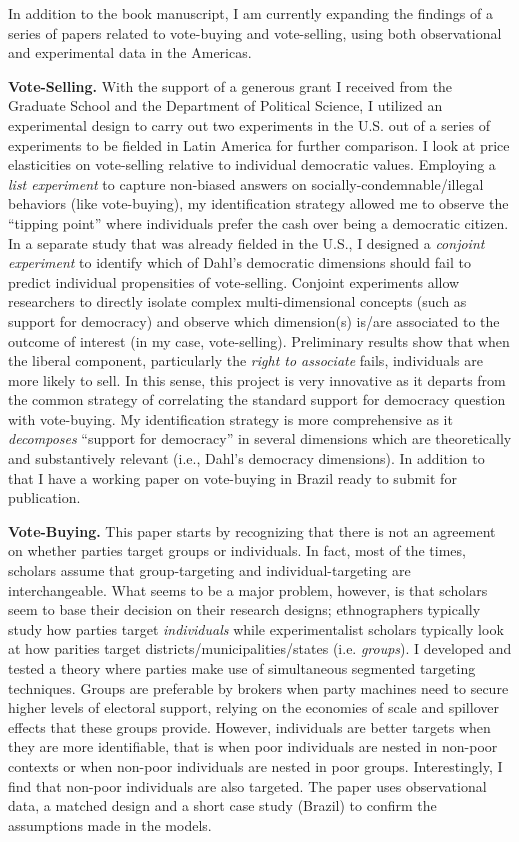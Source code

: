 \documentclass[10pt,stdletter,dateno,sigleft]{newlfm} %
\begin{document}
\begin{newlfm}
In addition to the book manuscript, I am currently expanding the findings of a series of papers related to vote-buying and vote-selling, using both observational and experimental data in the Americas. 

{\bf Vote-Selling.} With the support of a generous grant I received from the Graduate School and the Department of Political Science, I utilized an experimental design to carry out two experiments in the U.S. out of a series of experiments to be fielded in Latin America for further comparison. I look at price elasticities on vote-selling relative to individual democratic values. Employing a \emph{list experiment} to capture non-biased answers on socially-condemnable/illegal behaviors (like vote-buying), my identification strategy allowed me to observe the ``tipping point'' where individuals prefer the cash over being a democratic citizen. In a separate study that was already fielded in the U.S., I designed a \emph{conjoint experiment} to identify which of Dahl's democratic dimensions should fail to predict individual propensities of vote-selling. Conjoint experiments allow researchers to directly isolate complex multi-dimensional concepts (such as support for democracy) and observe which dimension(s) is/are associated to the outcome of interest (in my case, vote-selling). Preliminary results show that when the liberal component, particularly the \emph{right to associate} fails, individuals are more likely to sell. In this sense, this project is very innovative as it departs from the common strategy of correlating the standard support for democracy question with vote-buying. My identification strategy is more comprehensive as it \emph{decomposes} ``support for democracy'' in several dimensions which are theoretically and substantively relevant (i.e., Dahl's democracy dimensions). In addition to that I have a working paper on vote-buying in Brazil ready to submit for publication. 

{\bf Vote-Buying.} This paper starts by recognizing that there is not an agreement on whether parties target groups or individuals. In fact, most of the times, scholars assume that group-targeting and individual-targeting are interchangeable. What seems to be a major problem, however, is that scholars seem to base their decision on their research designs; ethnographers typically study how parties target \emph{individuals} while experimentalist scholars typically look at how parities target districts/municipalities/states (i.e. \emph{groups}). I developed and tested a theory where parties make use of simultaneous segmented targeting techniques. Groups are preferable by brokers when party machines need to secure higher levels of electoral support, relying on the economies of scale and spillover effects that these groups provide. However, individuals are better targets when they are more identifiable, that is when poor individuals are nested in non-poor contexts or when non-poor individuals are nested in poor groups. Interestingly, I find that non-poor individuals are also targeted. The paper uses observational data, a matched design and a short case study (Brazil) to confirm the assumptions made in the models.


\end{newlfm}
\end{document}
